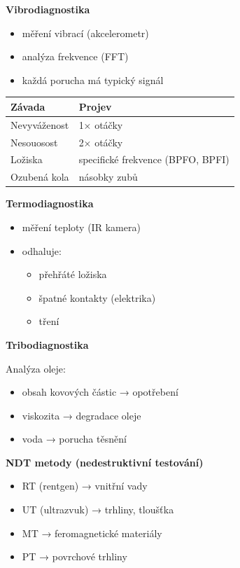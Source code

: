 \documentclass[a4paper,10pt]{article}
\begin{document}
\begin{vysvetlenibox}
\textbf{Vibrodiagnostika}

\begin{itemize}
\item měření vibrací (akcelerometr)
\item analýza frekvence (FFT)
\item každá porucha má typický signál
\end{itemize}

\begin{center}
\begin{tabularx}{0.95\linewidth}{l X}
Závada & Projev \\
\hline
Nevyváženost & 1× otáčky \\
Nesouosost & 2× otáčky \\
Ložiska & specifické frekvence (BPFO, BPFI) \\
Ozubená kola & násobky zubů \\
\end{tabularx}
\end{center}

\textbf{Termodiagnostika}

\begin{itemize}
\item měření teploty (IR kamera)
\item odhaluje:
\begin{itemize}
\item přehřáté ložiska
\item špatné kontakty (elektrika)
\item tření
\end{itemize}
\end{itemize}

\textbf{Tribodiagnostika}

Analýza oleje:

\begin{itemize}
\item obsah kovových částic → opotřebení
\item viskozita → degradace oleje
\item voda → porucha těsnění
\end{itemize}

\textbf{NDT metody (nedestruktivní testování)}

\begin{itemize}
\item RT (rentgen) → vnitřní vady
\item UT (ultrazvuk) → trhliny, tloušťka
\item MT → feromagnetické materiály
\item PT → povrchové trhliny
\end{itemize}


\end{vysvetlenibox}
\end{document}
